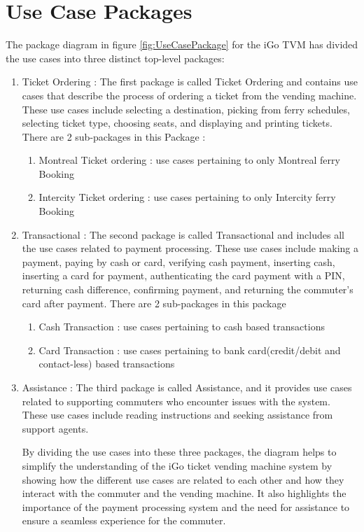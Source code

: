 \documentclass[letterpaper]{report}
\begin{document}
\section{Use Case Packages}
The package diagram in figure \ref{fig:UseCasePackage} for the iGo TVM has divided the use cases into three distinct top-level packages: 
\begin{enumerate}
\item Ticket Ordering : The first package is called Ticket Ordering and contains use cases that describe the process of ordering a ticket from the vending machine. These use cases include selecting a destination, picking from ferry schedules, selecting ticket type, choosing seats, and displaying and printing tickets. 
There are 2 sub-packages in this Package : 
\begin{enumerate}
    \item Montreal Ticket ordering : use cases pertaining to only Montreal ferry Booking
    \item Intercity Ticket ordering : use cases pertaining to only Intercity ferry Booking
\end{enumerate}

\item Transactional : The second package is called Transactional and includes all the use cases related to payment processing. These use cases include making a payment, paying by cash or card, verifying cash payment, inserting cash, inserting a card for payment, authenticating the card payment with a PIN, returning cash difference, confirming payment, and returning the commuter's card after payment.
There are 2 sub-packages in this package 
\begin{enumerate}
    \item Cash Transaction : use cases pertaining to cash based transactions
    \item Card Transaction : use cases pertaining to bank card(credit/debit and contact-less) based transactions
\end{enumerate}

\item Assistance : The third package is called Assistance, and it provides use cases related to supporting commuters who encounter issues with the system. These use cases include reading instructions and seeking assistance from support agents.

By dividing the use cases into these three packages, the diagram helps to simplify the understanding of the iGo ticket vending machine system by showing how the different use cases are related to each other and how they interact with the commuter and the vending machine. It also highlights the importance of the payment processing system and the need for assistance to ensure a seamless experience for the commuter.
\end{enumerate}
\end{document}
